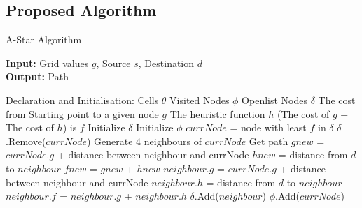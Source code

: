 \documentclass[conference]{IEEEtran}
\begin{document}
\subsection{Proposed Algorithm}
\begin{algorithm}[H]
    \caption{A-Star Algorithm}
    \hspace*{\algorithmicindent} \textbf{Input:} Grid values $g$, Source $s$, Destination $d$\\
    \hspace*{\algorithmicindent} \textbf{Output:} Path\\
    \begin{algorithmic}[1]
    \Statex Declaration and Initialisation:
    \State Cells $\theta$ %
    \State Visited Nodes $\phi$ %
    \State Openlist Nodes $\delta$ %
    \State The cost from Starting point to a given node $g$
    \State The heuristic function $h$
    \State (The cost of $g$ + The cost of $h$) is $f$
        \Return
    \EndIf
        \State \Return
    \EndIf
        \State \Return
    \EndIf
    \State Initialize $\delta$ 
    \State Initialize $\phi$
            \State $currNode$  = node with least $f$ in $\delta$
            \State $\delta$.Remove($currNode$)
            \State Generate 4 neighbours of $currNode$
                \State Get path
                \State \Return
                \State $gnew$ = $currNode$.$g$ + distance between neighbour and currNode
                \State $hnew$ = distance from $d$ to $neighbour$
                \State $fnew$ = $gnew$ + $hnew$
                \State $neighbour$.$g$ = $currNode$.$g$ + distance between neighbour and currNode
                \State $neighbour$.$h$ = distance from $d$ to $neighbour$
                \State $neighbour$.$f$ = $neighbour$.$g$ + $neighbour$.$h$
                \State $\delta$.Add($neighbour$)
                \EndIf
            \EndIf
            \EndFor
        \State $\phi$.Add($currNode$)
        \EndWhile
        \EndProcedure
    \end{algorithmic}
\end{algorithm}
\end{document}
